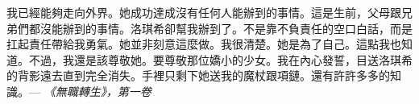 
\begin{acknowledgement}

我已經能夠走向外界。她成功達成沒有任何人能辦到的事情。這是生前，父母跟兄弟們都沒能辦到的事情。洛琪希卻幫我辦到了。不是靠不負責任的空口白話，而是扛起責任帶給我勇氣。她並非刻意這麼做。我很清楚。她是為了自己。這點我也知道。不過，我還是該尊敬她。要尊敬那位嬌小的少女。我在內心發誓，目送洛琪希的背影遠去直到完全消失。手裡只剩下她送我的魔杖跟項鏈。還有許許多多的知識。--- \textit{\Kai 《無職轉生》，第一卷}

\end{acknowledgement}